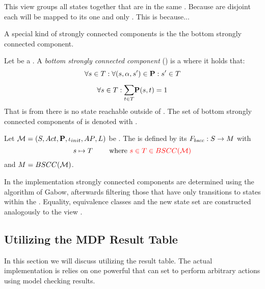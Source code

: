 \documentclass[preview]{standalone}
\begin{document}
This view groups all states together that are in the same \sccN. Because \sccsN are disjoint each \state will be mapped to its one and only \sccN. This is because... 

A special kind of strongly connected components is the the bottom strongly connected component.

\begin{definition}
	Let \scc be a \sccN. A \emph{bottom strongly connected component} (\bsccN) is a \sccN where it holds that: 
	\[
	\forall {s} \in {T} : \forall ({s}, {\alpha}, {s}') \in {\ensuremath{{\textbf{P}}}} : {s}' \in {T}
	\]
	\[
	\forall \state \in \scc : \bigsum{t \in \scc} \trans(\state, t) = 1
	\]
	That is from \scc there is no state reachable outside of \scc. The set of bottom strongly connected components of \chgph is denoted with \setbscc.
\end{definition}


\begin{definition}
	Let ${{{\mathcal{M}}}} = {{({S}, {Act}, {\textbf{P}}, {\iota_{init}}, {AP}, {L})}}$ be \chosengraphtypeN. The \viewN \viewbscc is defined by its \grpfctN ${{F_{bscc}}} : {S} \to {\ensuremath{{M}}}$ with
	\[
	\state \mapsto \scc \quad \quad \text{ where } \redcomment{\state \in \scc \in \setbscc}
	\]
	and ${{M}} = {BSCC({{{\mathcal{M}}}})}$.
\end{definition}

In the implementation strongly connected components are determined using the algorithm of Gabow, afterwards filtering those \sccsN that have only transitions to states within the \sccN. Equality, equivalence classes and the new state set are constructed analogously to the view \viewscc.

\subsection{Utilizing the MDP Result Table}
In this section we will discuss \viewsN utilizing the result table. The actual implementation is relies on one powerful \viewN that can set to perform arbitrary actions using model checking results.

\end{document}

